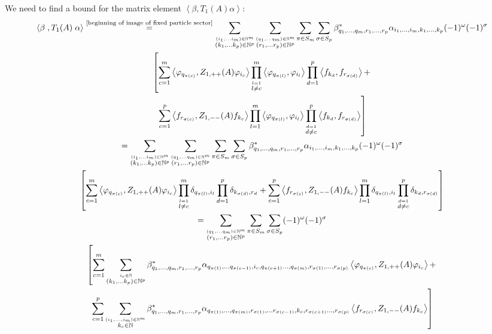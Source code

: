 \documentclass[a4paper,12pt]{article}
\newcommand{\equaltext}[1]{\ensuremath{\stackrel{\text{#1}}{=}}}
\begin{document}
We need to find a bound for the matrix element \(\left<\beta\right., T_1(A) \left.\alpha\right>\):
\begin{multline}
\left<\beta\right., T_1(A) \left.\alpha\right>\equaltext{\eqref{beginning of image of fixed particle sector}}\sum_{\stackrel{(i_1,\dots i_m)\in \mathbb{N}^m}{(k_1,\dots k_p)\in \mathbb{N}^p}}\sum_{\stackrel{(q_1,\dots q_m)\in \mathbb{N}^m}{(r_1,\dots r_p)\in \mathbb{N}^p}} \sum_{\pi \in S_m} \sum_{\sigma \in S_p} \beta^*_{q_1,\dots, q_m, r_1, \dots, r_p}  \alpha_{i_1,\dots, i_m, k_1, \dots, k_p} (-1)^\omega (-1)^\sigma \\
\left[\sum_{c=1}^m \left<\varphi_{q_{\pi(c)}} ,Z_{1,++}(A) \varphi_{i_c}\right> \prod_{\stackrel{l=1}{l\neq c}}^m  \left< \varphi_{q_{\pi(l)}}, \varphi_{i_l}\right> \prod_{d=1}^p\left< f_{k_{d}}, f_{r_{\sigma(d)}}\right> +\right.\\
\left. \sum_{c=1}^p \left<f_{r_{\sigma(c)}},Z_{1,--}(A)f_{k_c}\right> \prod_{l=1}^m  \left< \varphi_{q_{\pi(l)}},\varphi_{i_l}\right> \prod_{\stackrel{d=1}{d\neq c}}^p\left< f_{k_{d}}, f_{r_{\sigma(d)}}\right> \right]\\
=\sum_{\stackrel{(i_1,\dots i_m)\in \mathbb{N}^m}{(k_1,\dots k_p)\in \mathbb{N}^p}}\sum_{\stackrel{(q_1,\dots q_m)\in \mathbb{N}^m}{(r_1,\dots r_p)\in \mathbb{N}^p}} \sum_{\pi \in S_m} \sum_{\sigma \in S_p} \beta^*_{q_1,\dots, q_m, r_1, \dots, r_p}  \alpha_{i_1,\dots, i_m, k_1, \dots, k_p} (-1)^\omega (-1)^\sigma \\
\left[\sum_{c=1}^m \left<\varphi_{q_{\pi(c)}} ,Z_{1,++}(A) \varphi_{i_c}\right> \prod_{\stackrel{l=1}{l\neq c}}^m   \delta_{q_{\pi(l)},i_l} \prod_{d=1}^p \delta_{k_{\sigma(d)},r_d} +
\sum_{c=1}^p \left<f_{r_{\sigma(c)}},Z_{1,--}(A)f_{k_c}\right> \prod_{l=1}^m   \delta_{q_{\pi(l)},i_l} \prod_{\stackrel{d=1}{d\neq c}}^p \delta_{k_{d},r_{\sigma(d)}} \right]\\
=\sum_{\stackrel{(q_1,\dots q_m)\in \mathbb{N}^m}{(r_1,\dots r_p)\in \mathbb{N}^p}} \sum_{\pi \in S_m} \sum_{\sigma \in S_p}  (-1)^\omega (-1)^\sigma \\
\left[\sum_{c=1}^m \sum_{\stackrel{i_c\in \mathbb{N}}{(k_1,\dots k_p)\in \mathbb{N}^p}}\beta^*_{q_1,\dots, q_m, r_1, \dots, r_p} \alpha_{q_{\pi(1)},\dots q_{\pi(c-1)}, i_c,q_{\pi(c+1)} \dots, q_{\pi(m)}, r_{\sigma(1)}, \dots, r_{\sigma(p)}} \left<\varphi_{q_{\pi(c)}} ,Z_{1,++}(A) \varphi_{i_c}\right>  +\right.\\
\left.\sum_{c=1}^p \sum_{\stackrel{(i_1,\dots,i_m)\in \mathbb{N}^m}{k_c\in \mathbb{N}}} \beta^*_{q_1,\dots, q_m, r_1, \dots, r_p} \alpha_{q_{\pi(1)},\dots, q_{\pi(m)}, r_{\sigma(1)}, \dots r_{\sigma(c-1)}, k_{c},r_{\sigma(c+1)} \dots, r_{\sigma(p)}} \left<f_{r_{\sigma(c)}},Z_{1,--}(A)f_{k_c}\right> \right]\\

\end{multline}
\end{document}

